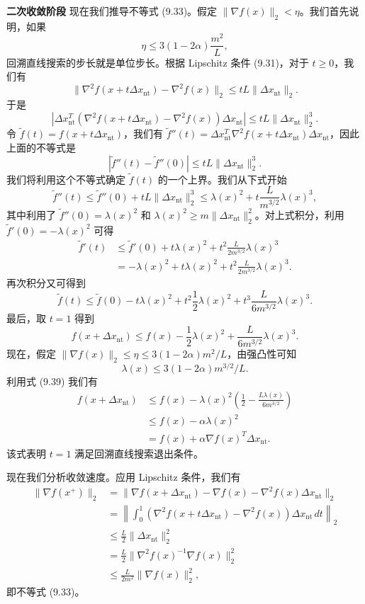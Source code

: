 \documentclass[UTF8,12pt,a4paper,fontset=fandol]{ctexart}
\begin{document}
\noindent\textbf{二次收敛阶段}\quad
现在我们推导不等式 (9.33)。假定 $\|\nabla f(x)\|_2<\eta$。我们首先说明，如果
\[
\eta\leq 3(1-2\alpha)\frac{m^2}{L},
\]
回溯直线搜索的步长就是单位步长。根据 Lipschitz 条件 (9.31)，对于 $t\geq0$，我们有
\[
\|\nabla^2f(x+t\Delta x_{\mathrm{nt}})-\nabla^2f(x)\|_2
\leq tL\|\Delta x_{\mathrm{nt}}\|_2.
\]
于是
\[
\left|\Delta x_{\mathrm{nt}}^T(\nabla^2f(x+t\Delta x_{\mathrm{nt}})-\nabla^2f(x))\Delta x_{\mathrm{nt}}\right|
\leq tL\|\Delta x_{\mathrm{nt}}\|_2^3.
\]
令 $\tilde{f}(t)=f(x+t\Delta x_{\mathrm{nt}})$，我们有 $\tilde{f}''(t)=\Delta x_{\mathrm{nt}}^T\nabla^2f(x+t\Delta x_{\mathrm{nt}})\Delta x_{\mathrm{nt}}$，因此上面的不等式是
\[
|\tilde{f}''(t)-\tilde{f}''(0)|\leq tL\|\Delta x_{\mathrm{nt}}\|_2^3.
\]
我们将利用这个不等式确定 $\tilde{f}(t)$ 的一个上界。我们从下式开始
\[
\tilde{f}''(t)\leq\tilde{f}''(0)+tL\|\Delta x_{\mathrm{nt}}\|_2^3
\leq\lambda(x)^2+t\frac{L}{m^{3/2}}\lambda(x)^3,
\]
其中利用了 $\tilde{f}''(0)=\lambda(x)^2$ 和 $\lambda(x)^2\geq m\|\Delta x_{\mathrm{nt}}\|_2^2$。对上式积分，利用 $\tilde{f}'(0)=-\lambda(x)^2$ 可得
\[
\begin{aligned}
\tilde{f}'(t)
&\leq \tilde{f}'(0)+t\lambda(x)^2+t^2\frac{L}{2m^{3/2}}\lambda(x)^3\\
&=-\lambda(x)^2+t\lambda(x)^2+t^2\frac{L}{2m^{3/2}}\lambda(x)^3.
\end{aligned}
\]
再次积分又可得到
\[
\tilde{f}(t)\leq\tilde{f}(0)-t\lambda(x)^2+t^2\frac{1}{2}\lambda(x)^2+t^3\frac{L}{6m^{3/2}}\lambda(x)^3.
\]
最后，取 $t=1$ 得到
\begin{equation}
f(x+\Delta x_{\mathrm{nt}})
\leq f(x)-\frac{1}{2}\lambda(x)^2+\frac{L}{6m^{3/2}}\lambda(x)^3.
\tag{9.39}
\end{equation}
现在，假定 $\|\nabla f(x)\|_2\leq\eta\leq3(1-2\alpha)m^2/L$，由强凸性可知
\[
\lambda(x)\leq 3(1-2\alpha)m^{3/2}/L.
\]
利用式 (9.39) 我们有
\[
\begin{aligned}
f(x+\Delta x_{\mathrm{nt}})
&\leq f(x)-\lambda(x)^2\left(\frac{1}{2}-\frac{L\lambda(x)}{6m^{3/2}}\right)\\
&\leq f(x)-\alpha\lambda(x)^2\\
&=f(x)+\alpha\nabla f(x)^T\Delta x_{\mathrm{nt}}.
\end{aligned}
\]
该式表明 $t=1$ 满足回溯直线搜索退出条件。

现在我们分析收敛速度。应用 Lipschitz 条件，我们有
\[
\begin{aligned}
\|\nabla f(x^+)\|_2
&=\|\nabla f(x+\Delta x_{\mathrm{nt}})-\nabla f(x)-\nabla^2f(x)\Delta x_{\mathrm{nt}}\|_2\\
&=\left\|\int_0^1(\nabla^2f(x+t\Delta x_{\mathrm{nt}})-\nabla^2f(x))\Delta x_{\mathrm{nt}}\,dt\right\|_2\\
&\leq \frac{L}{2}\|\Delta x_{\mathrm{nt}}\|_2^2\\
&=\frac{L}{2}\|\nabla^2f(x)^{-1}\nabla f(x)\|_2^2\\
&\leq \frac{L}{2m^2}\|\nabla f(x)\|_2^2,
\end{aligned}
\]
即不等式 (9.33)。
\end{document}
